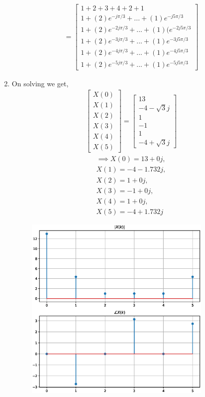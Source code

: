 \documentclass[journal,12pt,twocolumn]{IEEEtran}
\renewcommand\thesection{\arabic{section}}
\begin{document}
\begin{enumerate}[label=\thesection.\arabic*.,ref=\thesection.\theenumi]
\begin{align}
=
\begin{bmatrix}
1 +2+3+4+2+1 \\ 1+ (2)e^{-j\pi /3} + ... + (1)e^{-j5\pi /3}\\ 1 + (2)e^{-2j\pi /3} + ... +(1)(e^{-2j5\pi /3}\\ 1 + (2)e^{-3j\pi /3} + ... + (1)e^{-3j5\pi /3}\\ 1 + (2)e^{-4j\pi /3} + ... + (1)e^{-4j5\pi /3}\\ 1 + (2)e^{-5j\pi /3} + ... + (1)e^{-5j5\pi /3}
\end{bmatrix}
\end{align}
\item
On solving we get,
\begin{align}
    \begin{bmatrix} X(0) \\ X(1) \\ X(2) \\ X(3) \\ X(4) \\ X(5) \end{bmatrix}
=
\begin{bmatrix}
13 \\ 
-4-\sqrt{3}j\\ 
1  \\ 
-1 \\ 
1 \\ 
-4+\sqrt{3}j
\end{bmatrix}
\end{align}
\begin{align}
    \implies X(0) = 13 + 0j,\\
    X(1) = -4 - 1.732j,\\
    X(2) = 1 + 0j,
    \\
    X(3) = -1 + 0j,\\
    X(4) = 1 + 0j,\\
    X(5) = -4 + 1.732j
\end{align}
\begin{figure}[h!]
    \centering
    \includegraphics[width=9cm]{./figs/ee18btech11029_3.eps}

\end{figure}
\end{enumerate}
\end{document}
